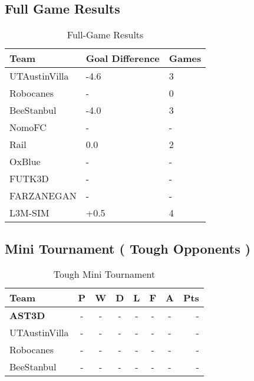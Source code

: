 \subsection{Full Game Results}

\begin{table}
\begin{center}
    \begin{tabular}{ | l | l | l | }
    \hline
    Team & Goal Difference & Games   \\ \hline
    UTAustinVilla 	& -4.6 			& 3 			\\ \hline	
    Robocanes 		& -				& 0 			\\ \hline
    BeeStanbul		& -4.0			& 3				\\ \hline
    NomoFC 			& - 			& - 			\\ \hline
    Rail 			& 0.0 			& 2 			\\ \hline
    OxBlue 			& - 			& - 			\\ \hline
    FUTK3D 			& - 			& - 			\\ \hline
    FARZANEGAN 		& - 			& - 			\\ \hline
    L3M-SIM			& +0.5 			& 4 			\\     
    \hline
    \end{tabular}
\end{center}
\label{GameResults}
\caption{Full-Game Results}
\end{table}

\subsection{Mini Tournament ( Tough Opponents )}
\begin{table}
\begin{center}
\begin{tabular}{l*{6}{c}r}
Team              & P & W & D & L & F  & A & Pts \\ \hline
\textbf{AST3D} & - & - & - & - & - & - & -  \\
UTAustinVilla            & - & - & - & - &  - & - &  -  \\
Robocanes           & - & - & - & - &  - & - &  -  \\
BeeStanbul     & - & - & - & - &  - & - &  - \\
\end{tabular}
\end{center}
\label{ToughTournament}
\caption{Tough Mini Tournament}
\end{table}

